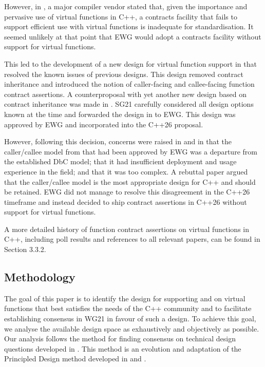 However, in \cite{P3173R0}, a major compiler vendor stated that, given the importance and pervasive use of virtual functions in C++, a contracts facility that fails to support efficient use with virtual functions is inadequate for standardisation. It seemed unlikely at that point that EWG would adopt a contracts facility without support for virtual functions.

This led to the development of a new design for virtual function support in \cite{P3097R0} that resolved the known issues of previous designs. This design removed contract inheritance and introduced the notion of caller-facing and callee-facing function contract assertions. A counterproposal with yet another new design based on contract inheritance was made in \cite{P3169R0}. SG21 carefully considered all design options known at the time and forwarded the design in \cite{P3097R0} to EWG. This design was approved by EWG and incorporated into the C++26 proposal.

However, following this decision, concerns were raised in \cite{P3506R0} and in \cite{P3573R0} that the caller/callee model from \cite{P3097R0} that had been approved by EWG was a departure from the established DbC model; that it had insufficient deployment and usage experience in the field; and that it was too complex. A rebuttal paper \cite{P3506R0} argued that the caller/callee model is the most appropriate design for C++ and should be retained. EWG did not manage to resolve this disagreement in the C++26 timeframe and instead decided to ship contract assertions in C++26 without support for virtual functions.

A more detailed history of function contract assertions on virtual functions in C++, including poll results and references to all relevant papers, can be found in \cite{P2899R1} Section 3.3.2.

\subsection{Methodology}

The goal of this paper is to identify the design for supporting  and  on virtual functions that best satisfies the needs of the C++ community and to facilitate establishing consensus in WG21 in favour of such a design. To achieve this goal, we analyse the available design space as exhaustively and objectively as possible. Our analysis follows the method for finding consensus on technical design questions developed in \cite{P3684R0}. This method is an evolution and adaptation of the Principled Design method developed in \cite{P3004R0} and \cite{P3005R0}.

